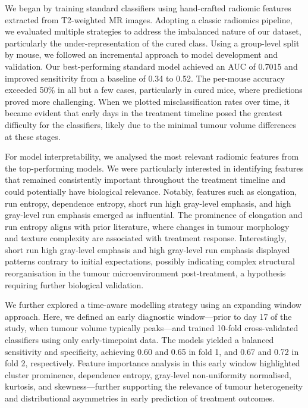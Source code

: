 \documentclass[12pt, a4paper]{report}
\begin{document}
We began by training standard classifiers using hand-crafted radiomic features extracted from T2-weighted MR images. Adopting a classic radiomics pipeline, we evaluated multiple strategies to address the imbalanced nature of our dataset, particularly the under-representation of the cured class. Using a group-level split by mouse, we followed an incremental approach to model development and validation. Our best-performing standard model achieved an AUC of 0.7015 and improved sensitivity from a baseline of 0.34 to 0.52. The per-mouse accuracy exceeded 50\% in all but a few cases, particularly in cured mice, where predictions proved more challenging. When we plotted misclassification rates over time, it became evident that early days in the treatment timeline posed the greatest difficulty for the classifiers, likely due to the minimal tumour volume differences at these stages.

For model interpretability, we analysed the most relevant radiomic features from the top-performing models. We were particularly interested in identifying features that remained consistently important throughout the treatment timeline and could potentially have biological relevance. Notably, features such as elongation, run entropy, dependence entropy, short run high gray-level emphasis, and high gray-level run emphasis emerged as influential. The prominence of elongation and run entropy aligns with prior literature, where changes in tumour morphology and texture complexity are associated with treatment response. Interestingly, short run high gray-level emphasis and high gray-level run emphasis displayed patterns contrary to initial expectations, possibly indicating complex structural reorganisation in the tumour microenvironment post-treatment, a hypothesis requiring further biological validation.

We further explored a time-aware modelling strategy using an expanding window approach. Here, we defined an early diagnostic window—prior to day 17 of the study, when tumour volume typically peaks—and trained 10-fold cross-validated classifiers using only early-timepoint data. The models yielded a balanced sensitivity and specificity, achieving 0.60 and 0.65 in fold 1, and 0.67 and 0.72 in fold 2, respectively. Feature importance analysis in this early window highlighted cluster prominence, dependence entropy, gray-level non-uniformity normalised, kurtosis, and skewness—further supporting the relevance of tumour heterogeneity and distributional asymmetries in early prediction of treatment outcomes.
\end{document}
